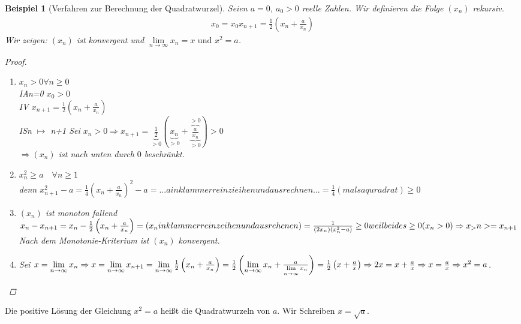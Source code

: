 \documentclass[a4paper,titlepage,oneside]{article}
\renewcommand{\liminf}[2][n]{\ensuremath{\lim\limits_{#1 \rightarrow \infty}{#2}}}
\theoremstyle{thmstyle}
\newtheorem{bsp}[satz]{Beispiel}
\begin{document}
\begin{bsp}[Verfahren zur Berechnung der Quadratwurzel]
Seien \(a = 0\), \(a_0 > 0\) reelle Zahlen. Wir definieren die Folge \((x_n)\) rekursiv.
\begin{align*}
x_0 = x_0
x_{n+1} = \frac{1}{2}\left(x_n + \frac{a}{x_n}\right)
\end{align*}
Wir zeigen: \((x_n)\) ist konvergent und \(\liminf{x_n} = x \text{ und } x^2 = a\).
\begin{proof}
\begin{enumerate}
\item \(x_n > 0 \forall n \ge 0\) \\
IA{n=0} \( x_0 > 0 \) \\
IV \(x_{n+1} =  \frac{1}{2}\left(x_n + \frac{a}{x_n}\right)\) \\
IS{n $\mapsto$ n+1}
Sei \(x_n > 0 \Rightarrow x_{n+1} = \underbrace{\frac{1}{2}}_{> 0}\left(\underbrace{x_n}_{> 0} + \underbrace{\overbrace{\frac{a}{x_n}}^{> 0}}_{>0}\right) > 0\) \\
\(\Rightarrow (x_n) \) ist nach unten durch \(0\) beschränkt.
\item \(x_n^2 \ge a \quad \forall n \ge 1\) \\
denn \(x_{n+1}^2 - a = \frac{1}{4}\left(x_n + \frac{a}{x_n}\right)^2  - a = ... a in klammer rein zieihen und ausrechnen ... = \frac{1}{4} (mals a quradrat) \ge 0\)
\item \((x_n)\) ist monoton fallend \\
\(x_n - x_{n+1} = x_n - \frac{1}{2} \left(x_n + \frac{a}{x_n}\right) = (x_n in klammer rein zeihen und ausrehcnen ) = \frac{1}{(2x_n)(x_n^2 - a)} \ge 0 \\
 weil beides \ge 0 (x_n > 0) \Rightarrow x_>n >= x_{n+1} \) \\
Nach dem Monotonie-Kriterium ist \((x_n)\) konvergent.
\item Sei \(x= \liminf{x_n} \Rightarrow x = \liminf{x_{n+1}} = \liminf{\frac{1}{2}\left(x_n + \frac{a}{x_n}\right)} = \frac{1}{2}\left(\liminf{x_n} + \frac{a}{\liminf{x_n}}\right) =  \frac{1}{2}\left(x + \frac{a}{x}\right) \Rightarrow 2x = x + \frac{a}{x} \Rightarrow  \\
x = \frac{a}{x} \Rightarrow x^2 = a\).
\end{enumerate}
\end{proof}
\end{bsp}
Die positive Lösung der Gleichung \(x^2 = a\) heißt die Quadratwurzeln von \(a\). Wir Schreiben \(x = \sqrt{a}\).
\end{document}
